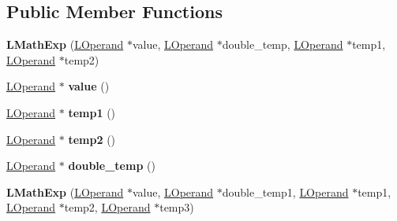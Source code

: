 \subsection*{Public Member Functions}
\begin{DoxyCompactItemize}
\item 
{\bfseries L\+Math\+Exp} (\hyperlink{classv8_1_1internal_1_1_l_operand}{L\+Operand} $\ast$value, \hyperlink{classv8_1_1internal_1_1_l_operand}{L\+Operand} $\ast$double\+\_\+temp, \hyperlink{classv8_1_1internal_1_1_l_operand}{L\+Operand} $\ast$temp1, \hyperlink{classv8_1_1internal_1_1_l_operand}{L\+Operand} $\ast$temp2)\hypertarget{classv8_1_1internal_1_1_l_math_exp_a558e5fb429ca96f45fce9f078a8fa0f6}{}\label{classv8_1_1internal_1_1_l_math_exp_a558e5fb429ca96f45fce9f078a8fa0f6}

\item 
\hyperlink{classv8_1_1internal_1_1_l_operand}{L\+Operand} $\ast$ {\bfseries value} ()\hypertarget{classv8_1_1internal_1_1_l_math_exp_a59d6185f1b9e035a269046376b4432b8}{}\label{classv8_1_1internal_1_1_l_math_exp_a59d6185f1b9e035a269046376b4432b8}

\item 
\hyperlink{classv8_1_1internal_1_1_l_operand}{L\+Operand} $\ast$ {\bfseries temp1} ()\hypertarget{classv8_1_1internal_1_1_l_math_exp_a430c8c030cbaad33b264a77b03e0db75}{}\label{classv8_1_1internal_1_1_l_math_exp_a430c8c030cbaad33b264a77b03e0db75}

\item 
\hyperlink{classv8_1_1internal_1_1_l_operand}{L\+Operand} $\ast$ {\bfseries temp2} ()\hypertarget{classv8_1_1internal_1_1_l_math_exp_adb7bff0a3a668396d3393908dab289df}{}\label{classv8_1_1internal_1_1_l_math_exp_adb7bff0a3a668396d3393908dab289df}

\item 
\hyperlink{classv8_1_1internal_1_1_l_operand}{L\+Operand} $\ast$ {\bfseries double\+\_\+temp} ()\hypertarget{classv8_1_1internal_1_1_l_math_exp_a60d7d35b6ddd8f46774958dce30597dc}{}\label{classv8_1_1internal_1_1_l_math_exp_a60d7d35b6ddd8f46774958dce30597dc}

\item 
{\bfseries L\+Math\+Exp} (\hyperlink{classv8_1_1internal_1_1_l_operand}{L\+Operand} $\ast$value, \hyperlink{classv8_1_1internal_1_1_l_operand}{L\+Operand} $\ast$double\+\_\+temp1, \hyperlink{classv8_1_1internal_1_1_l_operand}{L\+Operand} $\ast$temp1, \hyperlink{classv8_1_1internal_1_1_l_operand}{L\+Operand} $\ast$temp2, \hyperlink{classv8_1_1internal_1_1_l_operand}{L\+Operand} $\ast$temp3)\hypertarget{classv8_1_1internal_1_1_l_math_exp_a750f29b624b904bf98a53126ba1ad2e1}{}\label{classv8_1_1internal_1_1_l_math_exp_a750f29b624b904bf98a53126ba1ad2e1}


\end{DoxyCompactItemize}
